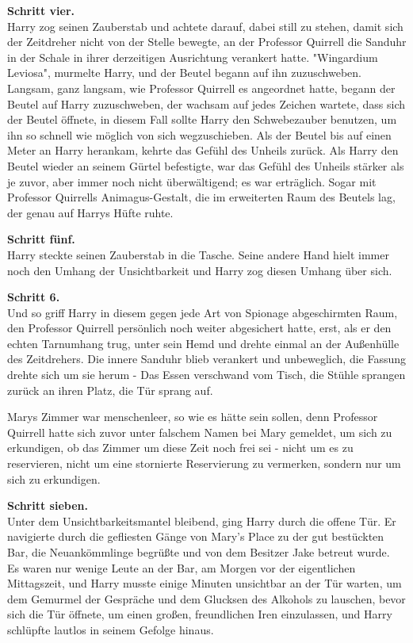 {\textbf{Schritt vier.}\\ Harry zog seinen Zauberstab und achtete darauf, dabei still zu stehen, damit sich der Zeitdreher nicht von der Stelle bewegte, an der Professor Quirrell die Sanduhr in der Schale in ihrer derzeitigen Ausrichtung verankert hatte. "Wingardium Leviosa", murmelte Harry, und der Beutel begann auf ihn zuzuschweben. Langsam, ganz langsam, wie Professor Quirrell es angeordnet hatte, begann der Beutel auf Harry zuzuschweben, der wachsam auf jedes Zeichen wartete, dass sich der Beutel öffnete, in diesem Fall sollte Harry den Schwebezauber benutzen, um ihn so schnell wie möglich von sich wegzuschieben. Als der Beutel bis auf einen Meter an Harry herankam, kehrte das Gefühl des Unheils zurück. Als Harry den Beutel wieder an seinem Gürtel befestigte, war das Gefühl des Unheils stärker als je zuvor, aber immer noch nicht überwältigend; es war erträglich. Sogar mit Professor Quirrells Animagus-Gestalt, die im erweiterten Raum des Beutels lag, der genau auf Harrys Hüfte ruhte.

\textbf{Schritt fünf.}\\ Harry steckte seinen Zauberstab in die Tasche. Seine andere Hand hielt immer noch den Umhang der Unsichtbarkeit und Harry zog diesen Umhang über sich.

\textbf{Schritt 6.}\\ Und so griff Harry in diesem gegen jede Art von Spionage abgeschirmten Raum, den Professor Quirrell persönlich noch weiter abgesichert hatte, erst, als er den echten Tarnumhang trug, unter sein Hemd und drehte einmal an der Außenhülle des Zeitdrehers. Die innere Sanduhr blieb verankert und unbeweglich, die Fassung drehte sich um sie herum - Das Essen verschwand vom Tisch, die Stühle sprangen zurück an ihren Platz, die Tür sprang auf.

Marys Zimmer war menschenleer, so wie es hätte sein sollen, denn Professor Quirrell hatte sich zuvor unter falschem Namen bei Mary gemeldet, um sich zu erkundigen, ob das Zimmer um diese Zeit noch frei sei - nicht um es zu reservieren, nicht um eine stornierte Reservierung zu vermerken, sondern nur um sich zu erkundigen.

\textbf{Schritt sieben.}\\ Unter dem Unsichtbarkeitsmantel bleibend, ging Harry durch die offene Tür. Er navigierte durch die gefliesten Gänge von Mary's Place zu der gut bestückten\\ Bar, die Neuankömmlinge begrüßte und von dem Besitzer Jake betreut wurde.\\ Es waren nur wenige Leute an der Bar, am Morgen vor der eigentlichen Mittagszeit, und Harry musste einige Minuten unsichtbar an der Tür warten, um dem Gemurmel der Gespräche und dem Glucksen des Alkohols zu lauschen, bevor sich die Tür öffnete, um einen großen, freundlichen Iren einzulassen, und Harry schlüpfte lautlos in seinem Gefolge hinaus.

}
